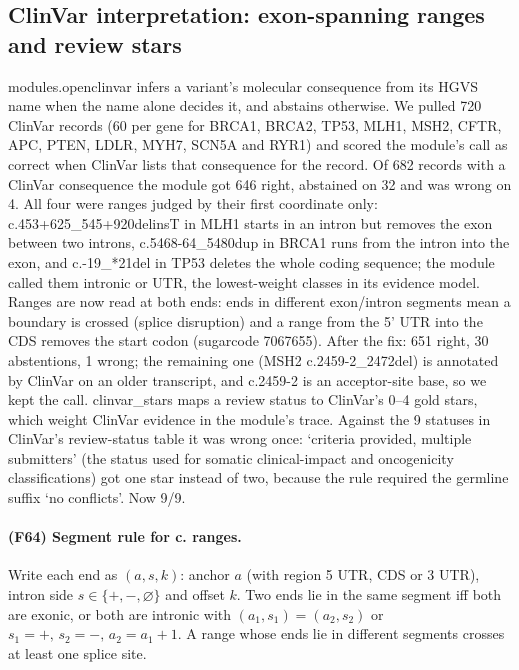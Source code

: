 \subsection{ClinVar interpretation: exon-spanning ranges and review stars}
modules.openclinvar infers a variant's molecular consequence from its HGVS name when the name alone decides it, and abstains otherwise. We pulled 720 ClinVar records (60 per gene for BRCA1, BRCA2, TP53, MLH1, MSH2, CFTR, APC, PTEN, LDLR, MYH7, SCN5A and RYR1) and scored the module's call as correct when ClinVar lists that consequence for the record. Of 682 records with a ClinVar consequence the module got 646 right, abstained on 32 and was wrong on 4. All four were ranges judged by their first coordinate only: c.453+625\_545+920delinsT in MLH1 starts in an intron but removes the exon between two introns, c.5468-64\_5480dup in BRCA1 runs from the intron into the exon, and c.-19\_*21del in TP53 deletes the whole coding sequence; the module called them intronic or UTR, the lowest-weight classes in its evidence model. Ranges are now read at both ends: ends in different exon/intron segments mean a boundary is crossed (splice disruption) and a range from the 5' UTR into the CDS removes the start codon (sugarcode 7067655). After the fix: 651 right, 30 abstentions, 1 wrong; the remaining one (MSH2 c.2459-2\_2472del) is annotated by ClinVar on an older transcript, and c.2459-2 is an acceptor-site base, so we kept the call.
clinvar\_stars maps a review status to ClinVar's 0--4 gold stars, which weight ClinVar evidence in the module's trace. Against the 9 statuses in ClinVar's review-status table it was wrong once: `criteria provided, multiple submitters' (the status used for somatic clinical-impact and oncogenicity classifications) got one star instead of two, because the rule required the germline suffix `no conflicts'. Now 9/9.
\paragraph{(F64) Segment rule for c. ranges.} Write each end as $(a,s,k)$: anchor $a$ (with region 5\textquotesingle{} UTR, CDS or 3\textquotesingle{} UTR), intron side $s\in\{+,-,\varnothing\}$ and offset $k$. Two ends lie in the same segment iff both are exonic, or both are intronic with $(a_1,s_1)=(a_2,s_2)$ or $s_1={+},\,s_2={-},\,a_2=a_1+1$. A range whose ends lie in different segments crosses at least one splice site.
